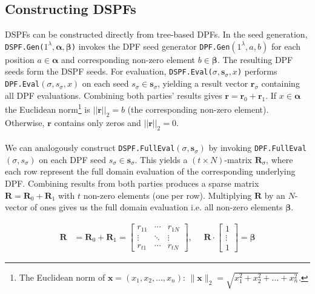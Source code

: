 \subsection{Constructing DSPFs}
\label{subseq:constructingTBDSPFs}
DSPFs can be constructed directly from tree-based DPFs. In the seed generation, \texttt{DSPF.Gen($1^\lambda, \boldsymbol{\alpha}, \boldsymbol{\beta}$)} invokes the DPF seed generator \texttt{DPF.Gen}$(1^\lambda, a, b)$ for each position $a \in \boldsymbol{\alpha}$ and corresponding non-zero element $b \in \boldsymbol{\beta}$. The resulting DPF seeds form the DSPF seeds. For evaluation, \texttt{DSPF.Eval($\sigma, \boldsymbol{s}_\sigma, x$)}  performs \texttt{DPF.Eval}$(\sigma, s_\sigma, x)$ on each seed $s_\sigma\in\boldsymbol{s}_\sigma$, yielding a result vector $\boldsymbol{r}_\sigma$ containing all DPF evaluations. Combining both parties' results gives $\boldsymbol{r} = \boldsymbol{r}_0 + \boldsymbol{r}_1$. If $x\in\boldsymbol{\alpha}$ the Euclidean norm\footnote{The Euclidean norm of \(\mathbf{x} = (x_1, x_2, ..., x_n)\): \(\|\mathbf{x}\|_2 = \sqrt{x_1^2 + x_2^2 + ... + x_n^2}\).}  is $||\boldsymbol{r}||_2=b$ (the corresponding non-zero element).  Otherwise, $\boldsymbol{r}$ contains only zeros and $||\boldsymbol{r}||_2=0$.
\\\\
We can analogously construct \texttt{DSPF.FullEval}$(\sigma, \boldsymbol{s}_\sigma)$ by invoking \texttt{DPF.FullEval}$(\sigma, s_\sigma)$ on each DPF seed $s_\sigma\in\boldsymbol{s}_\sigma$. This yields a $(t\times N)$-matrix $\boldsymbol{R}_\sigma$, where each row represent the full domain evaluation of the corresponding underlying DPF. Combining results from both parties produces a sparse matrix $\boldsymbol{R} = \boldsymbol{R}_0 + \boldsymbol{R}_1$ with $t$ non-zero elements (one per row).  Multiplying $\boldsymbol{R}$ by an $N$-vector of ones gives us the full domain evaluation i.e. all non-zero elements $\boldsymbol{\beta}$.

\begin{equation}
\begin{aligned}
\boldsymbol{R} &= \boldsymbol{R}_0 + \boldsymbol{R}_1 = \begin{bmatrix} r_{11} & \cdots & r_{1N} \\ \vdots & \ddots & \vdots \\ r_{t1} & \cdots & r_{tN} \end{bmatrix}, \:\:\:\:\:\:  \boldsymbol{R} \cdot \begin{bmatrix} 1 \\ \vdots \\ 1 \end{bmatrix} = \boldsymbol{\beta}
\end{aligned}
\end{equation}

